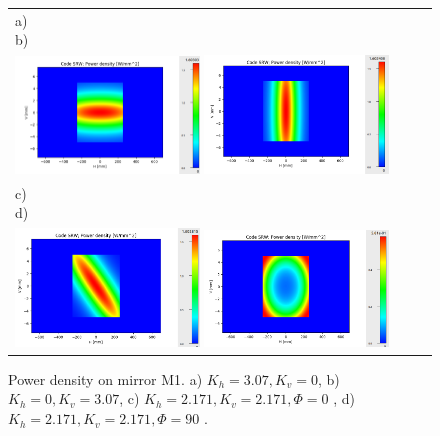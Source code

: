 \documentclass{iucr}              %
\begin{document}
\begin{figure} 
\begin{center}
\begin{tabular}{l} 
   a)~~~~~~~~~~~~~~~~~~~~~~~~~~~~~~~~~~~~~~~~~~~~
   b)~~~~~~~~~~~~~~~~~~~~~~~~~~~~~~~~~~~~~~~~~~~~\\
   \includegraphics[width=0.45\textwidth]{figures/powerdensityKv.png}
   \includegraphics[width=0.45\textwidth]{figures/powerdensityKh.png}\\
   c)~~~~~~~~~~~~~~~~~~~~~~~~~~~~~~~~~~~~~~~~~~~~
   d)~~~~~~~~~~~~~~~~~~~~~~~~~~~~~~~~~~~~~~~~~~~~\\
   \includegraphics[width=0.45\textwidth]{figures/powerdensityKhKv.png} 
      \includegraphics[width=0.45\textwidth]{figures/powerdensityKhKv90.png}
\end{tabular}
\end{center}
\caption
{ \label{fig:M1powerdensity} Power density on mirror M1.
a) $K_h=3.07, K_v=0$,
b) $K_h=0,K_v=3.07$,
c) $K_h=2.171,K_v=2.171, \Phi=0$ \textdegree,
d) $K_h=2.171,K_v=2.171, \Phi=90$ \textdegree.
}
\end{figure} 
\end{document}
